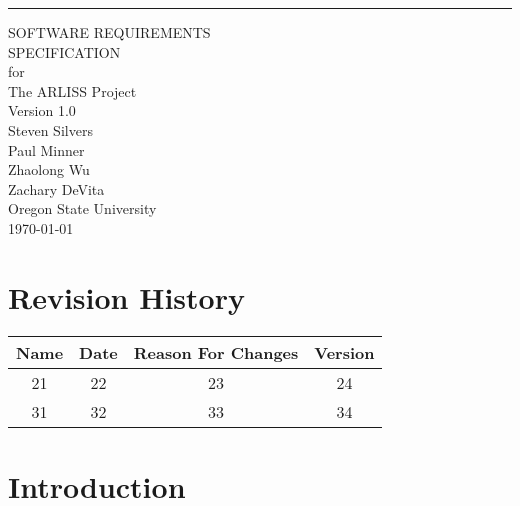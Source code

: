 \documentclass{scrreprt}
\date{}
\def\myversion{1.0 }
\begin{document}

\begin{flushright}
    \rule{16cm}{5pt}\vskip1cm
    \begin{bfseries}
        \Huge{SOFTWARE REQUIREMENTS\\ SPECIFICATION}\\
        \vspace{1.9cm}
        for\\
        \vspace{1.9cm}
        The ARLISS Project\\
        \vspace{1.5cm}
        \LARGE{Version \myversion}\\
        \vspace{1.9cm}
        	Steven Silvers\\
	Paul Minner\\
        	Zhaolong Wu\\
	Zachary DeVita\\
        \vspace{1.9cm}
        Oregon State University\\
        
        \today\\
	\vspace{1.9cm}
    \end{bfseries}
\end{flushright}

\tableofcontents
{}

\chapter*{Revision History}

\begin{center}
    \begin{tabular}{|c|c|c|c|}
        \hline
	    Name & Date & Reason For Changes & Version\\
        \hline
	    21 & 22 & 23 & 24\\
        \hline
	    31 & 32 & 33 & 34\\
        \hline
    \end{tabular}
\end{center}

\chapter{Introduction}
\end{document}
